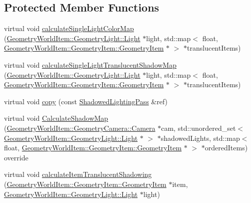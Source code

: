 \subsection*{Protected Member Functions}
\begin{DoxyCompactItemize}
\item 
virtual void \mbox{\hyperlink{class_geometry_engine_1_1_geometry_render_step_1_1_transparent_shadowed_lighting_pass_a2042175d916d295bf8b11be5f6911754}{calculate\+Single\+Light\+Color\+Map}} (\mbox{\hyperlink{class_geometry_engine_1_1_geometry_world_item_1_1_geometry_light_1_1_light}{Geometry\+World\+Item\+::\+Geometry\+Light\+::\+Light}} $\ast$light, std\+::map$<$ float, \mbox{\hyperlink{class_geometry_engine_1_1_geometry_world_item_1_1_geometry_item_1_1_geometry_item}{Geometry\+World\+Item\+::\+Geometry\+Item\+::\+Geometry\+Item}} $\ast$ $>$ $\ast$translucent\+Items)
\item 
virtual void \mbox{\hyperlink{class_geometry_engine_1_1_geometry_render_step_1_1_transparent_shadowed_lighting_pass_ab4dd63e51b154e66023e84a2487a14b2}{calculate\+Single\+Light\+Translucent\+Shadow\+Map}} (\mbox{\hyperlink{class_geometry_engine_1_1_geometry_world_item_1_1_geometry_light_1_1_light}{Geometry\+World\+Item\+::\+Geometry\+Light\+::\+Light}} $\ast$light, std\+::map$<$ float, \mbox{\hyperlink{class_geometry_engine_1_1_geometry_world_item_1_1_geometry_item_1_1_geometry_item}{Geometry\+World\+Item\+::\+Geometry\+Item\+::\+Geometry\+Item}} $\ast$ $>$ $\ast$translucent\+Items)
\item 
virtual void \mbox{\hyperlink{class_geometry_engine_1_1_geometry_render_step_1_1_transparent_shadowed_lighting_pass_ab88135daf4e0001a39ce4d9b4b7ff197}{copy}} (const \mbox{\hyperlink{class_geometry_engine_1_1_geometry_render_step_1_1_shadowed_lighting_pass}{Shadowed\+Lighting\+Pass}} \&ref)
\item 
virtual void \mbox{\hyperlink{class_geometry_engine_1_1_geometry_render_step_1_1_transparent_shadowed_lighting_pass_aab1aa8b25cbd61171470065af2b8c370}{Calculate\+Shadow\+Map}} (\mbox{\hyperlink{class_geometry_engine_1_1_geometry_world_item_1_1_geometry_camera_1_1_camera}{Geometry\+World\+Item\+::\+Geometry\+Camera\+::\+Camera}} $\ast$cam, std\+::unordered\+\_\+set$<$ \mbox{\hyperlink{class_geometry_engine_1_1_geometry_world_item_1_1_geometry_light_1_1_light}{Geometry\+World\+Item\+::\+Geometry\+Light\+::\+Light}} $\ast$ $>$ $\ast$shadowed\+Lights, std\+::map$<$ float, \mbox{\hyperlink{class_geometry_engine_1_1_geometry_world_item_1_1_geometry_item_1_1_geometry_item}{Geometry\+World\+Item\+::\+Geometry\+Item\+::\+Geometry\+Item}} $\ast$ $>$ $\ast$ordered\+Items) override
\item 
virtual void \mbox{\hyperlink{class_geometry_engine_1_1_geometry_render_step_1_1_transparent_shadowed_lighting_pass_acc1bb4b92b2c46deefca7db48645d6ef}{calculate\+Item\+Translucent\+Shadowing}} (\mbox{\hyperlink{class_geometry_engine_1_1_geometry_world_item_1_1_geometry_item_1_1_geometry_item}{Geometry\+World\+Item\+::\+Geometry\+Item\+::\+Geometry\+Item}} $\ast$item, \mbox{\hyperlink{class_geometry_engine_1_1_geometry_world_item_1_1_geometry_light_1_1_light}{Geometry\+World\+Item\+::\+Geometry\+Light\+::\+Light}} $\ast$light)
\end{DoxyCompactItemize}
